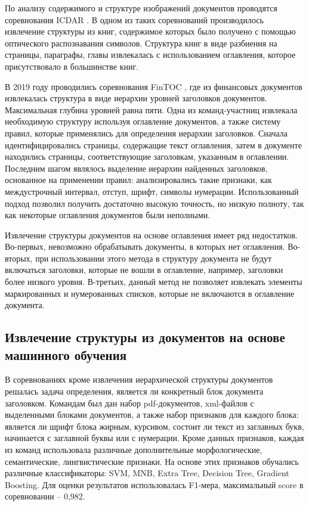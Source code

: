 \documentclass{ProcISPRAS}
\begin{document}
По анализу содержимого и структуре изображений документов проводятся соревнования ICDAR \cite{icdar13, icdar17comp, icdar17}. В одном из таких соревнований \cite{icdar13} производилось извлечение структуры из книг, содержимое которых было получено с помощью оптического распознавания символов. Структура книг в виде разбиения на страницы, параграфы, главы извлекалась с использованием оглавления, которое присутствовало в большинстве книг. 

В 2019 году проводились соревнования FinTOC \cite{fintoc19comp}, где из финансовых документов извлекалась структура в виде иерархии уровней заголовков документов. Максимальная глубина уровней равна пяти. Одна из команд-участниц \cite{fintoc19daniel} извлекала необходимую структуру используя оглавление документов, а также систему правил, которые применялись для определения иерархии заголовков.
Сначала идентифицировались страницы, содержащие текст оглавления, затем в документе находились страницы, соответствующие заголовкам, указанным в оглавлении. 
Последним шагом являлось выделение иерархии найденных заголовков, основанное на применении правил: анализировались такие признаки, как междустрочный интервал, отступ, шрифт, символы нумерации.
Использованный подход позволил получить достаточно высокую точность, но низкую полноту, так как некоторые оглавления документов были неполными.

Извлечение структуры документов на основе оглавления имеет ряд недостатков. Во-первых, невозможно обрабатывать документы, в которых нет оглавления. Во-вторых, при использовании этого метода в структуру документа не будут включаться заголовки, которые не вошли в оглавление, например, заголовки более низкого уровня. В-третьих, данный метод не позволяет извлекать элементы маркированных и нумерованных списков, которые не включаются в оглавление документа.

\subsection{Извлечение структуры из документов на основе машинного обучения}

В соревнованиях \cite{fintoc19comp} кроме извлечения иерархической структуры документов решалась задача определения, является ли конкретный блок документа заголовком. Командам был дан набор pdf-документов, xml-файлов с выделенными блоками документов, а также набор признаков для каждого блока: является ли шрифт блока жирным, курсивом, состоит ли текст из заглавных букв, начинается с заглавной буквы или с нумерации. Кроме данных признаков, каждая из команд использовала различные дополнительные морфологические, семантические, лингвистические признаки. На основе этих признаков обучались различные классификаторы: SVM, MNB, Extra Tree, Decision Tree, Gradient Boosting. Для оценки результатов использовалась F1-мера, максимальный score в соревновании -- 0,982.
\end{document}
